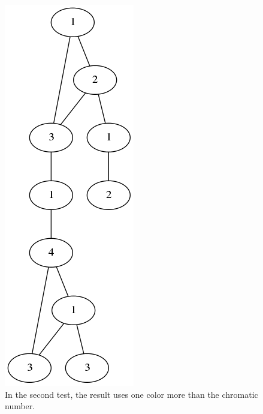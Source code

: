 \documentclass[11pt]{article}
\begin{document}
\begin{figure}[!htb]
\centering
\includegraphics[scale=0.5]{b.png}
\caption{In the second test, the result uses one color more than the chromatic number.}
\end{figure}
\end{document}
